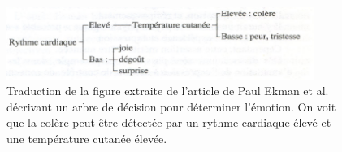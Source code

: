 \begin{figure}
  \centering
  \includegraphics[width=10cm]{./Chapitre1/figures/Ekman1983.png}
  \caption{Traduction de la figure extraite de l'article de Paul Ekman et al.~\cite{Ekman1983} décrivant un arbre de décision pour déterminer l'émotion. On voit que la colère peut être détectée par un rythme cardiaque élevé et une température cutanée élevée.}
  \label{fig:Ekman1983}
\end{figure}
